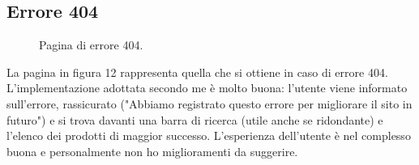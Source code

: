 \subsection{Errore 404}
\begin{figure}[!htb]
	\caption{\label{fig:figura12}} Pagina di errore 404.
\end{figure}
La pagina in figura 12 rappresenta quella che si ottiene in caso di errore 404. L'implementazione adottata secondo me è molto buona: l'utente viene informato sull'errore, rassicurato ("Abbiamo registrato questo errore per migliorare il sito in futuro") e si trova davanti una barra di ricerca (utile anche se ridondante) e l'elenco dei prodotti di maggior successo. L'esperienza dell'utente è nel complesso buona e personalmente non ho miglioramenti da suggerire.

